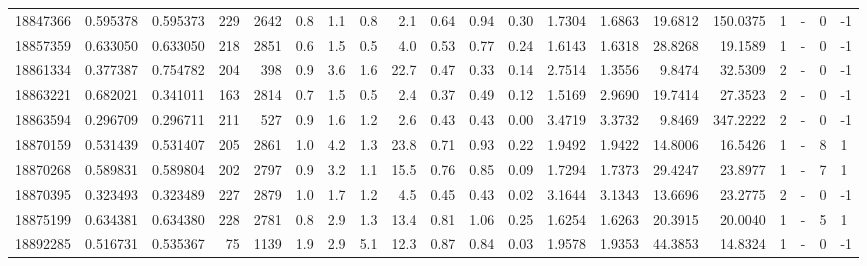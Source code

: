 \begin{tabular}{rrrrrrrrrrrrrrrrrlrl}
  18847366 & 0.595378 &   0.595373 &  229 & 2642 &      0.8 &      1.1 &     0.8 &      2.1 &       0.64 &        0.94 &        0.30 &  1.7304 &  1.6863 &   19.6812 &  150.0375 &       1 &             - &        0 &        -1 \\
  18857359 & 0.633050 &   0.633050 &  218 & 2851 &      0.6 &      1.5 &     0.5 &      4.0 &       0.53 &        0.77 &        0.24 &  1.6143 &  1.6318 &   28.8268 &   19.1589 &       1 &             - &        0 &        -1 \\
  18861334 & 0.377387 &   0.754782 &  204 &  398 &      0.9 &      3.6 &     1.6 &     22.7 &       0.47 &        0.33 &        0.14 &  2.7514 &  1.3556 &    9.8474 &   32.5309 &       2 &             - &        0 &        -1 \\
  18863221 & 0.682021 &   0.341011 &  163 & 2814 &      0.7 &      1.5 &     0.5 &      2.4 &       0.37 &        0.49 &        0.12 &  1.5169 &  2.9690 &   19.7414 &   27.3523 &       2 &             - &        0 &        -1 \\
  18863594 & 0.296709 &   0.296711 &  211 &  527 &      0.9 &      1.6 &     1.2 &      2.6 &       0.43 &        0.43 &        0.00 &  3.4719 &  3.3732 &    9.8469 &  347.2222 &       2 &             - &        0 &        -1 \\
  18870159 & 0.531439 &   0.531407 &  205 & 2861 &      1.0 &      4.2 &     1.3 &     23.8 &       0.71 &        0.93 &        0.22 &  1.9492 &  1.9422 &   14.8006 &   16.5426 &       1 &             - &        8 &         1 \\
  18870268 & 0.589831 &   0.589804 &  202 & 2797 &      0.9 &      3.2 &     1.1 &     15.5 &       0.76 &        0.85 &        0.09 &  1.7294 &  1.7373 &   29.4247 &   23.8977 &       1 &             - &        7 &         1 \\
  18870395 & 0.323493 &   0.323489 &  227 & 2879 &      1.0 &      1.7 &     1.2 &      4.5 &       0.45 &        0.43 &        0.02 &  3.1644 &  3.1343 &   13.6696 &   23.2775 &       2 &             - &        0 &        -1 \\
  18875199 & 0.634381 &   0.634380 &  228 & 2781 &      0.8 &      2.9 &     1.3 &     13.4 &       0.81 &        1.06 &        0.25 &  1.6254 &  1.6263 &   20.3915 &   20.0040 &       1 &             - &        5 &         1 \\
  18892285 & 0.516731 &   0.535367 &   75 & 1139 &      1.9 &      2.9 &     5.1 &     12.3 &       0.87 &        0.84 &        0.03 &  1.9578 &  1.9353 &   44.3853 &   14.8324 &       1 &             - &        0 &        -1 \\

\end{tabular}
